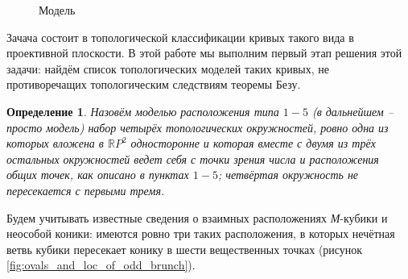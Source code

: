 \documentclass[14pt]{article}
\newtheorem{definition}{Определение}
\begin{document}
\begin{figure}[H]
\caption{Модель}
\label{fig:model_1-5}
\end{figure}

Зачача состоит в топологической классификации кривых такого вида в проективной плоскости. В этой работе мы выполним первый этап решения этой задачи: найдём список топологических моделей таких кривых, не противоречащих топологическим следствиям теоремы Безу.

\begin{definition}
Назовём моделью расположения типа $1-5$ (в дальнейшем – просто модель) набор четырёх топологических окружностей, ровно одна из которых вложена в $\mathbb RP^2$ односторонне и которая вместе с двумя из трёх остальных окружностей ведет себя с точки зрения числа и расположения общих точек, как описано в пунктах $1-5$; четвёртая окружность не пересекается с первыми тремя.
\end{definition}

Будем учитывать известные сведения о взаимных расположениях \textit{М}-кубики и неособой коники: имеются ровно три таких расположения, в которых нечётная ветвь кубики пересекает конику в шести вещественных точках (рисунок \ref{fig:ovals_and_loc_of_odd_brunch}).
\end{document}
